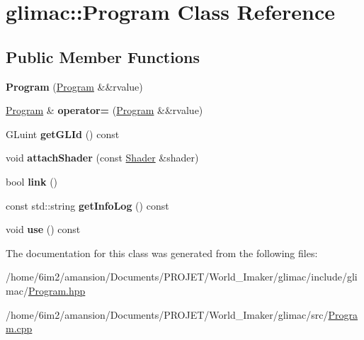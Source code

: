 \hypertarget{classglimac_1_1Program}{}\section{glimac\+:\+:Program Class Reference}
\label{classglimac_1_1Program}
\subsection*{Public Member Functions}
\begin{DoxyCompactItemize}
\item 
\mbox{\label{classglimac_1_1Program_aad59ed1f53824eda09b95fd1acdce674}} 
{\bfseries Program} (\hyperlink{classglimac_1_1Program}{Program} \&\&rvalue)
\item 
\mbox{\label{classglimac_1_1Program_a3ee1eac00a2e3fa4b6bab51d4333f33c}} 
\hyperlink{classglimac_1_1Program}{Program} \& {\bfseries operator=} (\hyperlink{classglimac_1_1Program}{Program} \&\&rvalue)
\item 
\mbox{\label{classglimac_1_1Program_ab1a519d005c77ba44876d1f309b38d18}} 
G\+Luint {\bfseries get\+G\+L\+Id} () const
\item 
\mbox{\label{classglimac_1_1Program_a5aac165d28cd6f704c01a3e0eee2119d}} 
void {\bfseries attach\+Shader} (const \hyperlink{classglimac_1_1Shader}{Shader} \&shader)
\item 
\mbox{\label{classglimac_1_1Program_a2f32f4f66ff9742750418f6fda054931}} 
bool {\bfseries link} ()
\item 
\mbox{\label{classglimac_1_1Program_aaf1769457ca41bca4afad7ecf90e9c3f}} 
const std\+::string {\bfseries get\+Info\+Log} () const
\item 
\mbox{\label{classglimac_1_1Program_a825cb4d58cccdf849730191ae5e118c6}} 
void {\bfseries use} () const
\end{DoxyCompactItemize}


The documentation for this class was generated from the following files\+:\begin{DoxyCompactItemize}
\item 
/home/6im2/amansion/\+Documents/\+P\+R\+O\+J\+E\+T/\+World\+\_\+\+Imaker/glimac/include/glimac/\hyperlink{Program_8hpp}{Program.\+hpp}\item 
/home/6im2/amansion/\+Documents/\+P\+R\+O\+J\+E\+T/\+World\+\_\+\+Imaker/glimac/src/\hyperlink{Program_8cpp}{Program.\+cpp}\end{DoxyCompactItemize}
